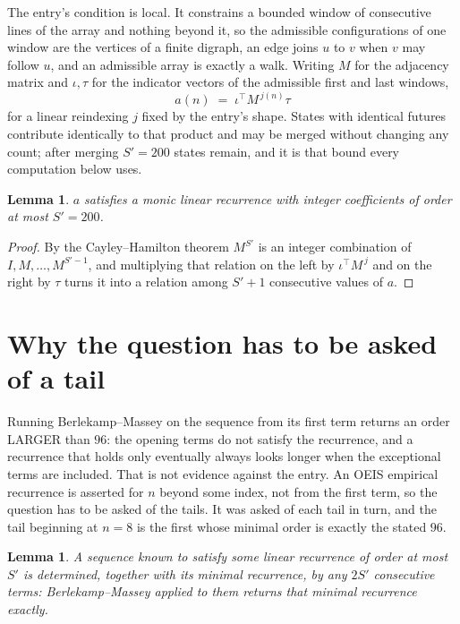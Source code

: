 \documentclass[11pt,a4paper]{article}
\theoremstyle{plain}
\newtheorem{lemma}[theorem]{Lemma}
\theoremstyle{definition}
\begin{document}
The entry's condition is local. It constrains a bounded window of consecutive lines of the
array and nothing beyond it, so the admissible configurations of one window are the vertices of
a finite digraph, an edge joins $u$ to $v$ when $v$ may follow $u$, and an admissible array is
exactly a walk. Writing $M$ for the adjacency matrix and $\iota,\tau$ for the indicator vectors
of the admissible first and last windows,
\[
a(n)\;=\;\iota^{\!\top}M^{\,j(n)}\tau
\]
for a linear reindexing $j$ fixed by the entry's shape. States with identical futures
contribute identically to that product and may be merged without changing any count; after
merging $S'=200$ states remain, and it is that bound every computation below uses.

\begin{lemma}\label{lem:cf}
$a$ satisfies a monic linear recurrence with integer coefficients of order at most $S'=200$.
\end{lemma}

\begin{proof}
By the Cayley--Hamilton theorem $M^{S'}$ is an integer combination of $I,M,\dots,M^{S'-1}$,
and multiplying that relation on the left by $\iota^{\!\top}M^{\,j}$ and on the right by
$\tau$ turns it into a relation among $S'+1$ consecutive values of $a$.
\end{proof}

\section{Why the question has to be asked of a tail}

Running Berlekamp--Massey on the sequence from its first term returns an order LARGER than $96$: the opening terms do not satisfy the recurrence, and a recurrence that holds only eventually always looks longer when the exceptional terms are included. That is not evidence against the entry. An OEIS empirical recurrence is asserted for $n$ beyond some index, not from the first term, so the question has to be asked of the tails. It was asked of each tail in turn, and the tail beginning at $n=8$ is the first whose minimal order is exactly the stated $96$.

\begin{lemma}\label{lem:bm}
A sequence known to satisfy some linear recurrence of order at most $S'$ is determined,
together with its minimal recurrence, by any $2S'$ consecutive terms: Berlekamp--Massey applied
to them returns that minimal recurrence exactly.
\end{lemma}
\end{document}
